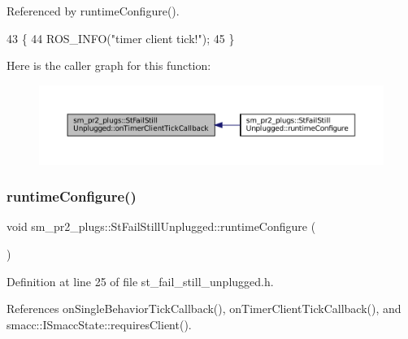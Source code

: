 Referenced by runtime\+Configure().


\begin{DoxyCode}
43     \{
44         ROS\_INFO(\textcolor{stringliteral}{"timer client tick!"});
45     \}
\end{DoxyCode}
Here is the caller graph for this function\+:
\nopagebreak
\begin{figure}[H]
\begin{center}
\leavevmode
\includegraphics[width=350pt]{structsm__pr2__plugs_1_1StFailStillUnplugged_a9778180fa18c15f2d94c774ebde4c7cf_icgraph}
\end{center}
\end{figure}
\mbox{\label{structsm__pr2__plugs_1_1StFailStillUnplugged_af8704d60b24ec65be825b5dc416632d1}} 
\subsubsection{\texorpdfstring{runtime\+Configure()}{runtimeConfigure()}}
{\footnotesize\ttfamily void sm\+\_\+pr2\+\_\+plugs\+::\+St\+Fail\+Still\+Unplugged\+::runtime\+Configure (\begin{DoxyParamCaption}{ }\end{DoxyParamCaption})\hspace{0.3cm}{\ttfamily [inline]}}



Definition at line 25 of file st\+\_\+fail\+\_\+still\+\_\+unplugged.\+h.



References on\+Single\+Behavior\+Tick\+Callback(), on\+Timer\+Client\+Tick\+Callback(), and smacc\+::\+I\+Smacc\+State\+::requires\+Client().


